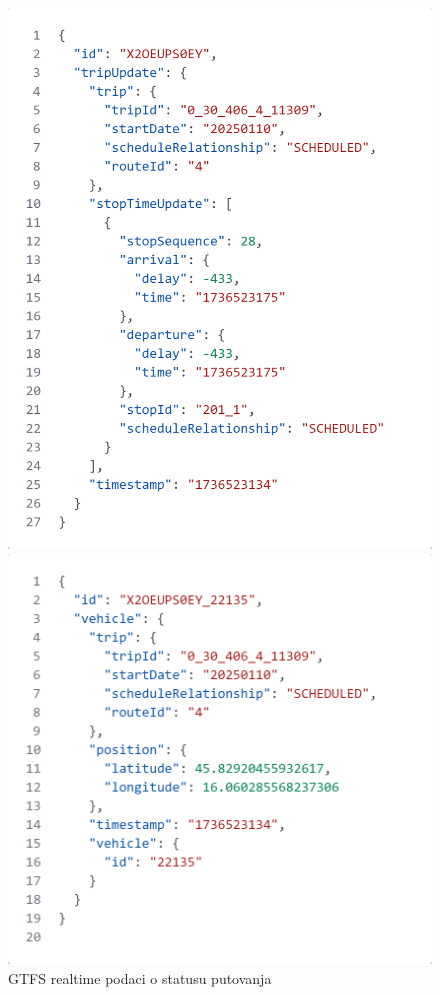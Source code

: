 \documentclass[seminarskirad]{fer}
\begin{document}
\begin{figure}[h!]
	\centering
	\begin{minipage}{0.48\textwidth}
		\centering
		\includegraphics[width=\textwidth]{Figures/code.png}
		\caption{GTFS realtime podaci o statusu putovanja}
		\label{fig:code1}
	\end{minipage}
	\hfill
	\begin{minipage}{0.48\textwidth}
		\centering
		\includegraphics[width=\textwidth]{Figures/code2.png}

\end{minipage}
\end{figure}
\end{document}
